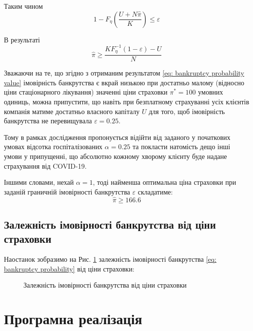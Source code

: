 \documentclass{mathreport}
\begin{document}
Таким чином 
\begin{equation}\label{eq: optimal policy price part 2}
    1 - F_{\eta}\left( \frac{U+N\widehat{\pi}}{K} \right) \leqslant \varepsilon
\end{equation}

В результаті
\begin{equation}\label{eq: optimal policy price part 3}
    \widehat{\pi} \geqslant \frac{KF_{\eta}^{-1}(1-\varepsilon) - U}{N}
\end{equation} 

Зважаючи на те, що згідно з отриманим результатом \eqref{eq: bankruptcy probability value} імовірність банкрутства є вкрай низькою при достатньо малому (відносно ціни стаціонарного лікування) значенні ціни страховки $\pi^*=100$ умовних одиниць, можна припустити, що навіть при безплатному страхуванні усіх клієнтів компанія матиме достатньо власного капіталу $U$ для того, щоб імовірність банкрутства не перевищувала $\varepsilon=0.25$.

Тому в рамках дослідження пропонується відійти від заданого у початкових умовах відсотка госпіталізованих $\alpha=0.25$ та покласти натомість дещо інші умови у припущенні, що абсолютно кожному хворому клієнту буде надане страхування від COVID-19. 

Іншими словами, нехай $\alpha=1$, тоді найменша оптимальна ціна страховки при заданій граничній імовірності банкрутства $\varepsilon$ складатиме:
\begin{equation}\label{eq: optimal policy price value}
    \widehat{\pi} \geqslant 166.6
\end{equation} 

\subsection{Залежність імовірності банкрутства від ціни страховки}

Наостанок зобразимо на Рис. \ref{pic: bankruptcy probability distribution} залежність імовірності банкрутства \eqref{eq: bankruptcy probability} від ціни страховки:

\begin{figure}[H]\centering
    
    \caption{Залежність імовірності банкрутства від ціни страховки}
    \label{pic: bankruptcy probability distribution}
\end{figure}

\section*{Програмна реалізація}
\end{document}

